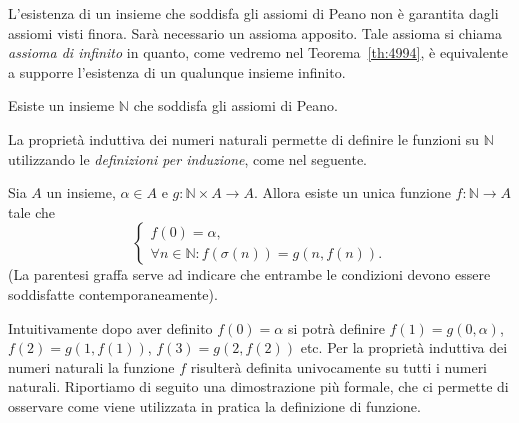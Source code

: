 \documentclass[italian,a4paper,hidelinks,headinclude]{scrartcl}
\newcommand{\NN}{{\mathbb N}}
\begin{document}
L'esistenza di un insieme che soddisfa gli assiomi di Peano non è garantita
dagli assiomi visti finora. Sarà necessario un assioma apposito.
Tale assioma si chiama \emph{assioma di infinito} in quanto, come vedremo
nel Teorema~\ref{th:4994}, è equivalente a supporre l'esistenza di un
qualunque insieme infinito.

\begin{axiom}[di infinito]
  Esiste un insieme $\NN$ che soddisfa gli assiomi di Peano.
\end{axiom}

La proprietà induttiva dei numeri naturali permette di definire le funzioni su
$\NN$ utilizzando le \emph{definizioni per induzione}, come nel seguente.
%
\begin{theorem}\label{th:def_induction}
Sia $A$ un insieme, $\alpha \in A$ e $g\colon \NN\times A \to A$.
Allora esiste un unica funzione $f\colon \NN \to A$ tale che
\begin{equation}\label{eq:485452}
\begin{cases}
  f(0) = \alpha,\\
  \forall n\in \NN\colon f(\sigma(n)) = g(n, f(n)).
\end{cases}
\end{equation}
(La parentesi graffa serve ad indicare che entrambe le condizioni devono
essere soddisfatte contemporaneamente).
\end{theorem}
%
Intuitivamente dopo aver definito $f(0) = \alpha$ si potrà definire
$f(1) = g(0, \alpha)$, $f(2) = g(1, f(1))$, $f(3) = g(2, f(2))$ etc.
Per la proprietà induttiva dei numeri naturali la funzione $f$ risulterà
definita univocamente su tutti i numeri naturali.
Riportiamo di seguito una dimostrazione più formale, che ci permette di
osservare come viene utilizzata in pratica la definizione di funzione.
%
\end{document}
